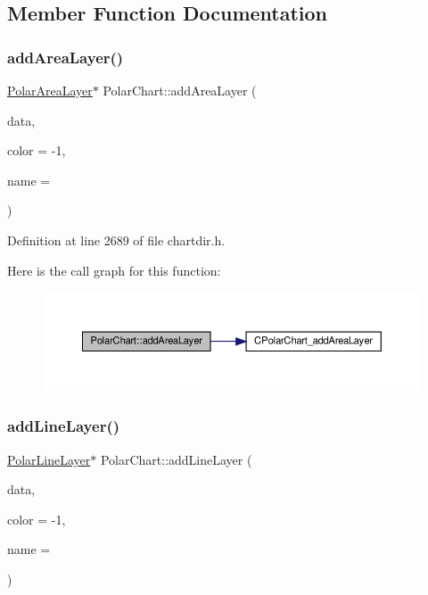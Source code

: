 \subsection{Member Function Documentation}
\mbox{\label{class_polar_chart_a36a592c0473d015113d9add78d9dfbad}} 
\subsubsection{\texorpdfstring{add\+Area\+Layer()}{addAreaLayer()}}
{\footnotesize\ttfamily \hyperlink{class_polar_area_layer}{Polar\+Area\+Layer}$\ast$ Polar\+Chart\+::add\+Area\+Layer (\begin{DoxyParamCaption}\item[{\hyperlink{class_double_array}{Double\+Array}}]{data,  }\item[{int}]{color = {\ttfamily -\/1},  }\item[{const char $\ast$}]{name = {} }\end{DoxyParamCaption})\hspace{0.3cm}{\ttfamily [inline]}}



Definition at line 2689 of file chartdir.\+h.

Here is the call graph for this function\+:
\nopagebreak
\begin{figure}[H]
\begin{center}
\leavevmode
\includegraphics[width=350pt]{class_polar_chart_a36a592c0473d015113d9add78d9dfbad_cgraph}
\end{center}
\end{figure}
\mbox{\label{class_polar_chart_a5d54191f10884a95b52f3098a4e33c3c}} 
\subsubsection{\texorpdfstring{add\+Line\+Layer()}{addLineLayer()}}
{\footnotesize\ttfamily \hyperlink{class_polar_line_layer}{Polar\+Line\+Layer}$\ast$ Polar\+Chart\+::add\+Line\+Layer (\begin{DoxyParamCaption}\item[{\hyperlink{class_double_array}{Double\+Array}}]{data,  }\item[{int}]{color = {\ttfamily -\/1},  }\item[{const char $\ast$}]{name = {} }\end{DoxyParamCaption})\hspace{0.3cm}{\ttfamily [inline]}}



